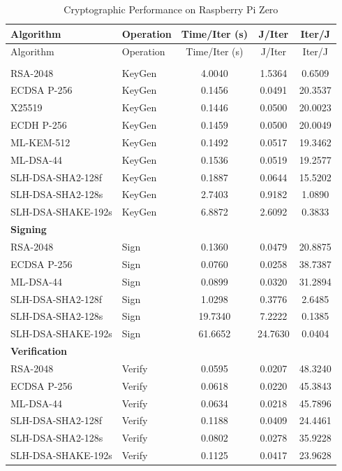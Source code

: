 \documentclass[11pt, letterpaper]{article}
\begin{document}
\begin{longtable}{llccc}
\caption{Cryptographic Performance on Raspberry Pi Zero} \\
\hline
Algorithm & Operation & Time/Iter (s) & J/Iter & Iter/J \\
\hline
\endfirsthead

\hline
Algorithm & Operation & Time/Iter (s) & J/Iter & Iter/J \\
\hline
\endhead

\hline
\endfoot

\hline
\endlastfoot

\multicolumn{5}{l}{\textbf{Key Generation}} \\

RSA-2048 & KeyGen & 4.0040 & 1.5364 & 0.6509 \\
ECDSA P-256 & KeyGen & 0.1456 & 0.0491 & 20.3537 \\
X25519 & KeyGen & 0.1446 & 0.0500 & 20.0023 \\
ECDH P-256 & KeyGen & 0.1459 & 0.0500 & 20.0049 \\
ML-KEM-512 & KeyGen & 0.1492 & 0.0517 & 19.3462 \\
ML-DSA-44 & KeyGen & 0.1536 & 0.0519 & 19.2577 \\
SLH-DSA-SHA2-128f & KeyGen & 0.1887 & 0.0644 & 15.5202 \\
SLH-DSA-SHA2-128s & KeyGen & 2.7403 & 0.9182 & 1.0890 \\
SLH-DSA-SHAKE-192s & KeyGen & 6.8872 & 2.6092 & 0.3833 \\

\multicolumn{5}{l}{\textbf{Signing}} \\

RSA-2048 & Sign & 0.1360 & 0.0479 & 20.8875 \\
ECDSA P-256 & Sign & 0.0760 & 0.0258 & 38.7387 \\
ML-DSA-44 & Sign & 0.0899 & 0.0320 & 31.2894 \\
SLH-DSA-SHA2-128f & Sign & 1.0298 & 0.3776 & 2.6485 \\
SLH-DSA-SHA2-128s & Sign & 19.7340 & 7.2222 & 0.1385 \\
SLH-DSA-SHAKE-192s & Sign & 61.6652 & 24.7630 & 0.0404 \\

\multicolumn{5}{l}{\textbf{Verification}} \\

RSA-2048 & Verify & 0.0595 & 0.0207 & 48.3240 \\
ECDSA P-256 & Verify & 0.0618 & 0.0220 & 45.3843 \\
ML-DSA-44 & Verify & 0.0634 & 0.0218 & 45.7896 \\
SLH-DSA-SHA2-128f & Verify & 0.1188 & 0.0409 & 24.4461 \\
SLH-DSA-SHA2-128s & Verify & 0.0802 & 0.0278 & 35.9228 \\
SLH-DSA-SHAKE-192s & Verify & 0.1125 & 0.0417 & 23.9628 \\

\end{longtable}
\end{document}
